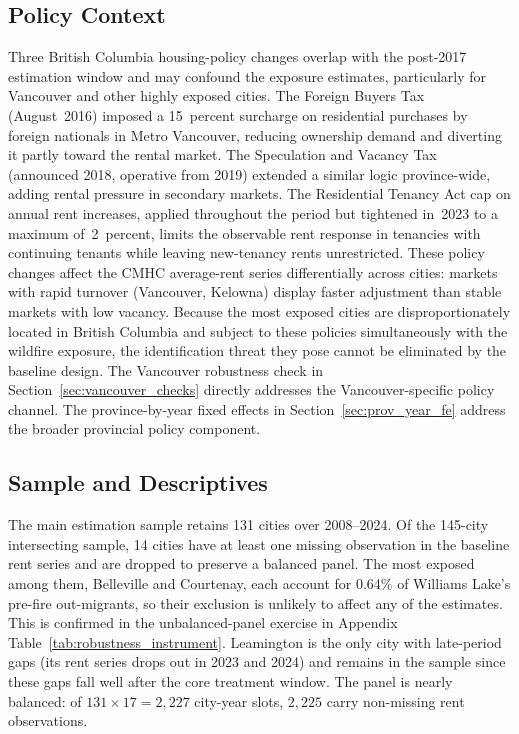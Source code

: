 \documentclass[12pt]{article}
\begin{document}
\subsection{Policy Context}
\label{sec:bc_policy}

Three British Columbia housing-policy changes overlap with the post-2017 estimation
window and may confound the exposure estimates, particularly for Vancouver and other
highly exposed cities. The Foreign Buyers Tax (August~2016) imposed a
15~percent surcharge on residential purchases by foreign nationals in Metro Vancouver,
reducing ownership demand and diverting it partly toward the rental market.
The Speculation and Vacancy Tax (announced 2018, operative from 2019) extended
a similar logic province-wide, adding rental pressure in secondary markets.
The Residential Tenancy Act cap on annual rent increases, applied throughout
the period but tightened in~2023 to a maximum of~2~percent, limits the observable
rent response in tenancies with continuing tenants while leaving new-tenancy rents
unrestricted. These policy changes affect the CMHC average-rent series differentially
across cities: markets with rapid turnover (Vancouver, Kelowna) display faster
adjustment than stable markets with low vacancy. Because the most exposed cities are
disproportionately located in British Columbia and subject to these policies
simultaneously with the wildfire exposure, the identification threat they pose
cannot be eliminated by the baseline design. The Vancouver robustness check in
Section~\ref{sec:vancouver_checks} directly addresses the Vancouver-specific
policy channel. The province-by-year fixed effects in
Section~\ref{sec:prov_year_fe} address the broader provincial policy component.

\subsection{Sample and Descriptives}

The main estimation sample retains 131 cities over 2008--2024. Of the
145-city intersecting sample, 14 cities have at least one missing observation
in the baseline rent series and are dropped to preserve a balanced panel.
The most exposed among them, Belleville and Courtenay, each account for
0.64\% of Williams Lake's pre-fire out-migrants, so their exclusion is
unlikely to affect any of the estimates. This is confirmed in the
unbalanced-panel exercise in Appendix Table~\ref{tab:robustness_instrument}.
Leamington is the only city with late-period gaps (its rent series drops
out in 2023 and 2024) and remains in the sample since these gaps fall well
after the core treatment window. The panel is nearly balanced: of
$131 \times 17 = 2{,}227$ city-year slots, $2{,}225$ carry non-missing rent
observations.
\end{document}
